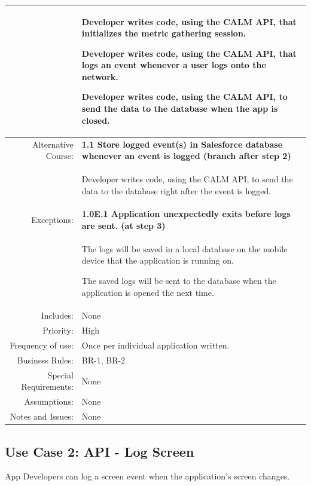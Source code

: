 \documentclass[12pt,oneside,letterpaper]{article}
\newenvironment{packed_enumerate}{ %
\vspace{-7mm}
\begin{enumerate}
  \setlength{\itemsep}{0pt}
  \setlength{\parskip}{0pt}
  \setlength{\parsep}{0pt}
}{\end{enumerate}
\vspace{-8mm}}
\begin{document}
\begin{longtable}{|r|p{3.8in}|}
&
\begin{packed_enumerate}
\item Developer writes code, using the CALM API, that initializes the metric gathering session.
\item Developer writes code, using the CALM API, that logs an event whenever a user logs onto the network.
\item Developer writes code, using the CALM API, to send the data to the database when the app is closed.
\end{packed_enumerate}\\
\hline
Alternative Course:&\textbf{1.1 Store logged event(s) in Salesforce 
database whenever an event is logged (branch after step 2)}\\
&
\begin{packed_enumerate}
\item Developer writes code, using the CALM API, to send the data to 
the database right after the event is logged.
\end{packed_enumerate}\\
\hline
Exceptions:&\textbf{1.0E.1 Application unexpectedly exits before logs 
are sent. (at step 3)}\\
&
\begin{packed_enumerate}
\item The logs will be saved in a local database on the mobile device 
that the application is running on. 
\item The saved logs will be sent to the database when the application 
is opened the next time.
\end{packed_enumerate}\\
\hline
Includes:&None\\
\hline
Priority:&High\\
\hline
Frequency of use:&Once per individual application written.\\
\hline
Business Rules:&BR-1, BR-2\\
\hline
Special Requirements:&None\\
\hline
Assumptions:&None\\
\hline
Notes and Issues:&None\\
\hline
\end{longtable}

\subsection{\label{APILogScreen}Use Case 2: API - Log Screen}
App Developers can log a screen event when the application's screen changes.\\
\end{document}
